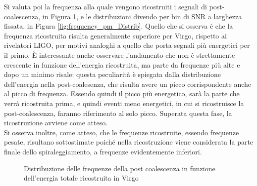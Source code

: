 Si valuta poi la frequenza alla quale vengono ricostruiti i segnali di post-coalescenza, in Figura \ref{fig:frequency_pm_colz}, e le distribuzioni divendo per bin di SNR a larghezza fissata, in Figura \ref{fig:frequency_pm_Distrib}. Quello che si osserva è che la frequenza ricostruita risulta generalmente superiore per Virgo, rispetto ai rivelatori LIGO, per motivi analoghi a quello che porta segnali più energetici per il primo. È interessante anche osservare l'andamento che non è strettamente crescente in funzione dell'energia ricostruita, ma parte da frequenze più alte e dopo un minimo risale: questa peculiarità è spiegata dalla distribuzione dell'energia nella post-coalesenza, che risulta avere un picco corrispondente anche al picco di frequenza. Essendo quindi il picco più energetico, sarà la parte che verrà ricostruita prima, e quindi eventi meno energetici, in cui si ricostruisce la post-coalescenza, faranno riferimento al solo picco. Superata questa fase, la ricostruzione avviene come atteso.\\
Si osserva inoltre, come atteso, che le frequenze ricostruite, essendo frequenze pesate, risultano sottostimate poiché nella ricostruzione viene considerata la parte finale dello spiraleggiamento, a frequenze evidentemente inferiori.
\begin{figure}[ht]
	\vspace{-15pt}
	\centering
	\caption{Distribuzione delle frequenze della post coalescenza in funzione dell'energia totale ricostruita in Virgo}
	\label{fig:frequency_pm_colz}
\end{figure}
